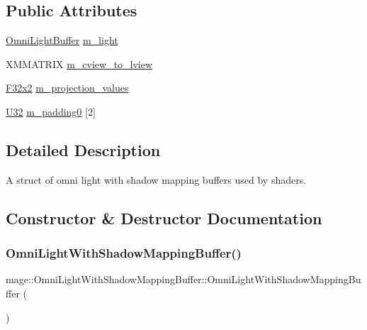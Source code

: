 \subsection*{Public Attributes}
\begin{DoxyCompactItemize}
\item 
\hyperlink{structmage_1_1_omni_light_buffer}{Omni\+Light\+Buffer} \hyperlink{structmage_1_1_omni_light_with_shadow_mapping_buffer_ad04cdb09bc31de362f8f4f75aa5b6aea}{m\+\_\+light}
\item 
X\+M\+M\+A\+T\+R\+IX \hyperlink{structmage_1_1_omni_light_with_shadow_mapping_buffer_ac8818649198198519826adf18fe0da7d}{m\+\_\+cview\+\_\+to\+\_\+lview}
\item 
\hyperlink{namespacemage_aa87237ad091f5cd7da612b8523fc108f}{F32x2} \hyperlink{structmage_1_1_omni_light_with_shadow_mapping_buffer_a4eed76cd814c81bfcb6300d69f7d7024}{m\+\_\+projection\+\_\+values}
\item 
\hyperlink{namespacemage_a41c104c036fba3756a74e19f793eeaa1}{U32} \hyperlink{structmage_1_1_omni_light_with_shadow_mapping_buffer_aaaf8cc62c3bb6607d2efb6c0b5069f87}{m\+\_\+padding0} \mbox{[}2\mbox{]}
\end{DoxyCompactItemize}


\subsection{Detailed Description}
A struct of omni light with shadow mapping buffers used by shaders. 

\subsection{Constructor \& Destructor Documentation}
\hypertarget{structmage_1_1_omni_light_with_shadow_mapping_buffer_a45f8c34629b1458b04786458416fda40}{}\label{structmage_1_1_omni_light_with_shadow_mapping_buffer_a45f8c34629b1458b04786458416fda40} 
\subsubsection{\texorpdfstring{Omni\+Light\+With\+Shadow\+Mapping\+Buffer()}{OmniLightWithShadowMappingBuffer()}\hspace{0.1cm}{\footnotesize\ttfamily [1/3]}}
{\footnotesize\ttfamily mage\+::\+Omni\+Light\+With\+Shadow\+Mapping\+Buffer\+::\+Omni\+Light\+With\+Shadow\+Mapping\+Buffer (\begin{DoxyParamCaption}{ }\end{DoxyParamCaption})\hspace{0.3cm}{\ttfamily [noexcept]}}

